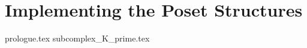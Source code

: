 \documentclass[class=article, crop=false]{standalone}
\begin{document}
\section{Implementing the Poset Structures}	

{prologue.tex}
{subcomplex_K_prime.tex}
\end{document}
